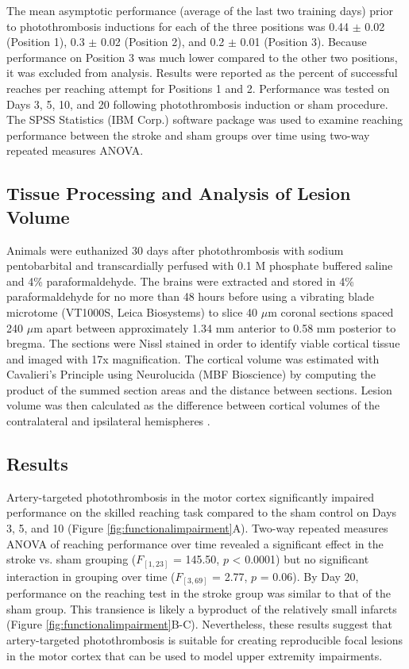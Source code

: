 The mean asymptotic performance (average of the last two training days) prior to photothrombosis inductions for each of the three positions was 0.44 $\pm$ 0.02 (Position 1), 0.3 $\pm$ 0.02 (Position 2), and 0.2 $\pm$ 0.01 (Position 3). Because performance on Position 3 was much lower compared to the other two positions, it was excluded from analysis. Results were reported as the percent of successful reaches per reaching attempt for Positions 1 and 2. Performance was tested on Days 3, 5, 10, and 20 following photothrombosis induction or sham procedure. The SPSS Statistics (IBM Corp.) software package was used to examine reaching performance between the stroke and sham groups over time using two-way repeated measures ANOVA.

\subsection{Tissue Processing and Analysis of Lesion Volume}

Animals were euthanized 30 days after photothrombosis with sodium pentobarbital and transcardially perfused with 0.1 M phosphate buffered saline and 4\% paraformaldehyde. The brains were extracted and stored in 4\% paraformaldehyde for no more than 48 hours before using a vibrating blade microtome (VT1000S, Leica Biosystems) to slice 40 $\mu$m coronal sections spaced 240 $\mu$m apart between approximately 1.34 mm anterior to 0.58 mm posterior to bregma. The sections were Nissl stained in order to identify viable cortical tissue and imaged with 17x magnification. The cortical volume was estimated with Cavalieri's Principle \cite{Rosen:1990bf} using Neurolucida (MBF Bioscience) by computing the product of the summed section areas and the distance between sections. Lesion volume was then calculated as the difference between cortical volumes of the contralateral and ipsilateral hemispheres \cite{Tennant:2011cx}.

\subsection{Results}

Artery-targeted photothrombosis in the motor cortex significantly impaired performance on the skilled reaching task compared to the sham control on Days 3, 5, and 10 (Figure \ref{fig:functionalimpairment}A). Two-way repeated measures ANOVA of reaching performance over time revealed a significant effect in the stroke vs. sham grouping ($F_{[1,23]}$ = 145.50, $p$ \textless{} 0.0001) but no significant interaction in grouping over time ($F_{[3,69]}$ = 2.77, $p$ = 0.06). By Day 20, performance on the reaching test in the stroke group was similar to that of the sham group. This transience is likely a byproduct of the relatively small infarcts (Figure \ref{fig:functionalimpairment}B-C). Nevertheless, these results suggest that artery-targeted photothrombosis is suitable for creating reproducible focal lesions in the motor cortex that can be used to model upper extremity impairments.

